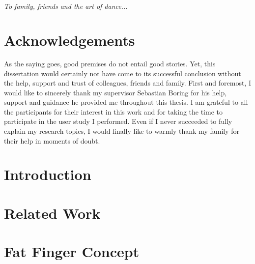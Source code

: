 \documentclass[10pt,twoside]{report}
\begin{document}
\cleardoublepage

\chapter*{}
\Large
\vspace{5cm}
\emph{To family, friends and the art of dance...}
\cleardoublepage



\normalsize
\chapter*{Acknowledgements}

As the saying goes, good premises do not entail good stories. Yet, this dissertation would certainly not have come to its successful conclusion without the help, support and trust of colleagues, friends and family.
First and foremost, I would like to sincerely thank my supervisor Sebastian Boring for his help, support and guidance he provided me throughout this thesis.
I am grateful to all the participants for their interest in this work and for taking the time to participate in the user study I performed.
Even if I never succeeded to fully explain my research topics, I would finally like to warmly thank my family for their help in moments of doubt.
\cleardoublepage

\tableofcontents
\cleardoublepage

\listoffigures
\cleardoublepage

\listoftables
\cleardoublepage


\pagestyle{fancy}

\chapter{Introduction}
\label{sec:Introduction}

\cleardoublepage

\chapter{Related Work}
\label{sec:RelatedWork}

\cleardoublepage

\chapter{Fat Finger Concept}
\label{sec:FatFingerConcept}

\cleardoublepage
\end{document}
